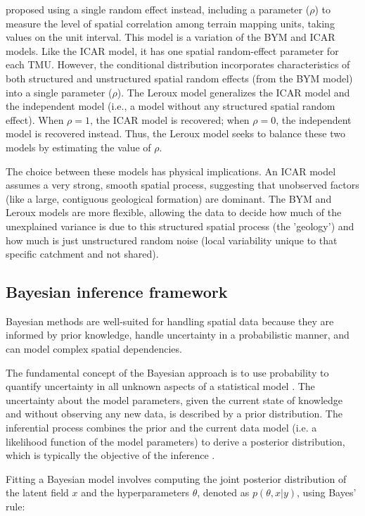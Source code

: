 \documentclass[journal abbreviation, manuscript]{copernicus}
\begin{document}
\citet{leroux2000estimation} proposed using a single random effect instead, including a parameter ($\rho$) to measure the level of spatial correlation among terrain mapping units, taking values on the unit interval. This model is a variation of the BYM and ICAR models. Like the ICAR model, it has one spatial random-effect parameter for each TMU. However, the conditional distribution incorporates characteristics of both structured and unstructured spatial random effects (from the BYM model) into a single parameter ($\rho$). The Leroux model generalizes the ICAR model and the independent model (i.e., a model without any structured spatial random effect). When $\rho = 1$, the ICAR model is recovered; when $\rho = 0$, the independent model is recovered instead. Thus, the Leroux model seeks to balance these two models by estimating the value of $\rho$.

The choice between these models has physical implications. An ICAR model assumes a very strong, smooth spatial process, suggesting that unobserved factors (like a large, contiguous geological formation) are dominant. The BYM and Leroux models are more flexible, allowing the data to decide how much of the unexplained variance is due to this structured spatial process (the 'geology') and how much is just unstructured random noise (local variability unique to that specific catchment and not shared).

\subsection{Bayesian inference framework}\label{subsec23}

Bayesian methods are well-suited for handling spatial data because they are informed by prior knowledge, handle uncertainty in a probabilistic manner, and can model complex spatial dependencies.

The fundamental concept of the Bayesian approach is to use probability to quantify uncertainty in all unknown aspects of a statistical model \citep{johnson2022bayes}. The uncertainty about the model parameters, given the current state of knowledge and without observing any new data, is described by a prior distribution. The inferential process combines the prior and the current data model (i.e. a likelihood function of the model parameters) to derive a posterior distribution, which is typically the objective of the inference \citep{congdon2014applied}.

Fitting a Bayesian model involves computing the joint posterior distribution of the latent field $x$ and the hyperparameters $\theta$, denoted as $p(\theta, x|y)$, using Bayes' rule:
\end{document}
